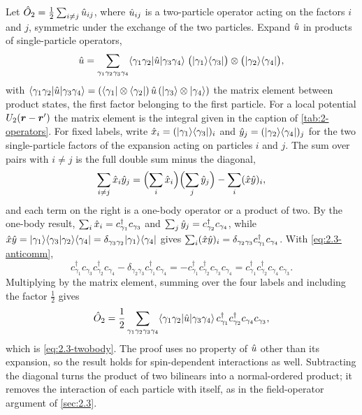 Let $\hat{O}_2 = \tfrac12\sum_{i\ne j}\hat{u}_{ij}$, where $\hat{u}_{ij}$ is a two-particle operator acting on the factors $i$ and $j$, symmetric under the exchange of the two particles. Expand $\hat{u}$ in products of single-particle operators,
\begin{equation*}
  \hat{u} = \sum_{\gamma_1\gamma_2\gamma_3\gamma_4}\langle\gamma_1\gamma_2|\hat{u}|\gamma_3\gamma_4\rangle\;\bigl(|\gamma_1\rangle\langle\gamma_3|\bigr)\otimes\bigl(|\gamma_2\rangle\langle\gamma_4|\bigr),
\end{equation*}
with $\langle\gamma_1\gamma_2|\hat{u}|\gamma_3\gamma_4\rangle = (\langle\gamma_1|\otimes\langle\gamma_2|)\,\hat{u}\,(|\gamma_3\rangle\otimes|\gamma_4\rangle)$ the matrix element between product states, the first factor belonging to the first particle. For a local potential $U_2(\bm{r} - \bm{r}')$ the matrix element is the integral given in the caption of \cref{tab:2-operators}. For fixed labels, write $\hat{x}_i = (|\gamma_1\rangle\langle\gamma_3|)_i$ and $\hat{y}_j = (|\gamma_2\rangle\langle\gamma_4|)_j$ for the two single-particle factors of the expansion acting on particles $i$ and $j$. The sum over pairs with $i \ne j$ is the full double sum minus the diagonal,
\begin{equation*}
  \sum_{i\ne j}\hat{x}_i\hat{y}_j = \Bigl(\sum_i\hat{x}_i\Bigr)\Bigl(\sum_j\hat{y}_j\Bigr) - \sum_i(\hat{x}\hat{y})_i ,
\end{equation*}
and each term on the right is a one-body operator or a product of two. By the one-body result, $\sum_i\hat{x}_i = c^\dagger_{\gamma_1}c_{\gamma_3}$ and $\sum_j\hat{y}_j = c^\dagger_{\gamma_2}c_{\gamma_4}$, while $\hat{x}\hat{y} = |\gamma_1\rangle\langle\gamma_3|\gamma_2\rangle\langle\gamma_4| = \delta_{\gamma_3\gamma_2}|\gamma_1\rangle\langle\gamma_4|$ gives $\sum_i(\hat{x}\hat{y})_i = \delta_{\gamma_2\gamma_3}c^\dagger_{\gamma_1}c_{\gamma_4}$. With \cref{eq:2.3-anticomm},
\begin{equation*}
  c^\dagger_{\gamma_1}c_{\gamma_3}c^\dagger_{\gamma_2}c_{\gamma_4} - \delta_{\gamma_2\gamma_3}c^\dagger_{\gamma_1}c_{\gamma_4}
  = -c^\dagger_{\gamma_1}c^\dagger_{\gamma_2}c_{\gamma_3}c_{\gamma_4}
  = c^\dagger_{\gamma_1}c^\dagger_{\gamma_2}c_{\gamma_4}c_{\gamma_3} .
\end{equation*}
Multiplying by the matrix element, summing over the four labels and including the factor $\tfrac12$ gives
\begin{equation}
  \hat{O}_2 = \frac12\sum_{\gamma_1\gamma_2\gamma_3\gamma_4}\langle\gamma_1\gamma_2|\hat{u}|\gamma_3\gamma_4\rangle\,c^\dagger_{\gamma_1}c^\dagger_{\gamma_2}c_{\gamma_4}c_{\gamma_3} ,
  \label{eq:D.2-twobody}
\end{equation}
which is \cref{eq:2.3-twobody}. The proof uses no property of $\hat{u}$ other than its expansion, so the result holds for spin-dependent interactions as well. Subtracting the diagonal turns the product of two bilinears into a normal-ordered product; it removes the interaction of each particle with itself, as in the field-operator argument of \cref{sec:2.3}.

